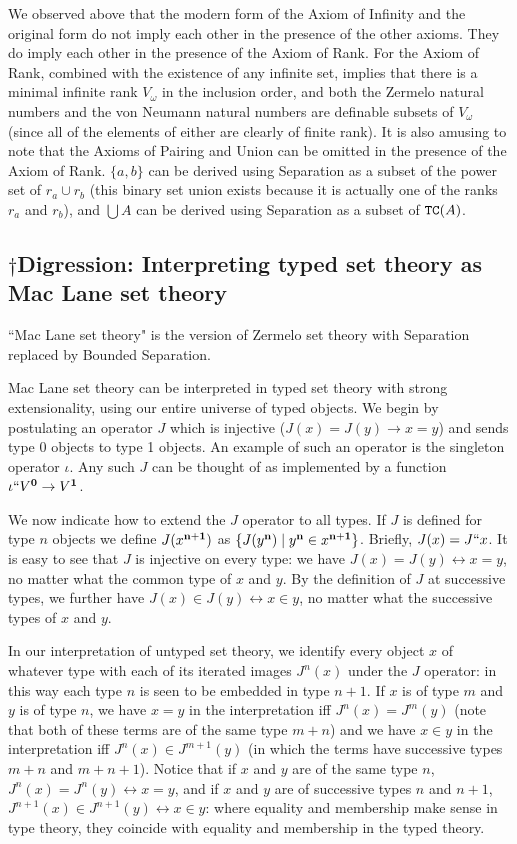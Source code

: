 \documentclass[12pt]{book}
\begin{document}
We observed above that the modern form of the Axiom of Infinity and
the original form do not imply each other in the presence of the other
axioms.  They do imply each other in the presence of the Axiom of
Rank.  For the Axiom of Rank, combined with the existence of any
infinite set, implies that there is a minimal infinite rank
$V_{\omega}$ in the inclusion order, and both the Zermelo natural
numbers and the von Neumann natural numbers are definable subsets of
$V_{\omega}$ (since all of the elements of either are clearly of
finite rank).  It is also amusing to note that the Axioms of Pairing
and Union can be omitted in the presence of the Axiom of Rank.
$\{a,b\}$ can be derived using Separation as a subset of the power set
of $r_a \cup r_b$ (this binary set union exists because it is actually
one of the ranks $r_a$ and $r_b$), and $\bigcup A$ can be derived
using Separation as a subset of ${\tt TC}(A)$.

\newpage

\subsection{$\dagger$Digression: Interpreting typed set theory as Mac Lane set theory}

``Mac Lane set theory" is the version of Zermelo set theory with Separation replaced by Bounded Separation.

Mac Lane set theory can be interpreted in typed
set theory with strong extensionality, using our entire universe of
typed objects.  We begin by postulating an operator $J$ which is
injective ($J(x)=J(y) \rightarrow x=y$) and sends type 0 objects to
type 1 objects.  An example of such an operator is the singleton
operator $\iota$.  Any such $J$ can be thought of as implemented by a
function $\iota``V^{\bf 0} \rightarrow V^{\bf 1}$.

We now indicate how to extend the $J$ operator to all types.  If $J$
is defined for type $n$ objects we define $J(x^{\bf n+1})$ as
$\{J(y^{\bf n}) \mid y^{\bf n} \in x^{\bf n+1}\}$.  Briefly, $J(x) =
J``x$.  It is easy to see that $J$ is injective on every type: we have
$J(x)=J(y) \leftrightarrow x=y$, no matter what the common type of $x$ and $y$.
By the definition of $J$ at successive types, we further have $J(x)
\in J(y) \leftrightarrow x\in y$, no matter what the successive types of $x$
and $y$.

In our interpretation of untyped set theory, we identify every object
$x$ of whatever type with each of its iterated images $J^n(x)$ under
the $J$ operator: in this way each type $n$ is seen to be embedded in
type $n+1$.  If $x$ is of type $m$ and $y$ is of type $n$, we have
$x=y$ in the interpretation iff $J^n(x)=J^m(y)$ (note that both of
these terms are of the same type $m+n$) and we have $x \in y$ in the
interpretation iff $J^{n}(x) \in J^{m+1}(y)$ (in which the terms have
successive types $m+n$ and $m+n+1$).  Notice that if $x$ and $y$ are
of the same type $n$, $J^n(x) = J^n(y) \leftrightarrow x=y$, and if
$x$ and $y$ are of successive types $n$ and $n+1$, $J^{n+1}(x) \in
J^{n+1}(y) \leftrightarrow x\in y$: where equality and membership make
sense in type theory, they coincide with equality and membership in
the typed theory.
\end{document}
